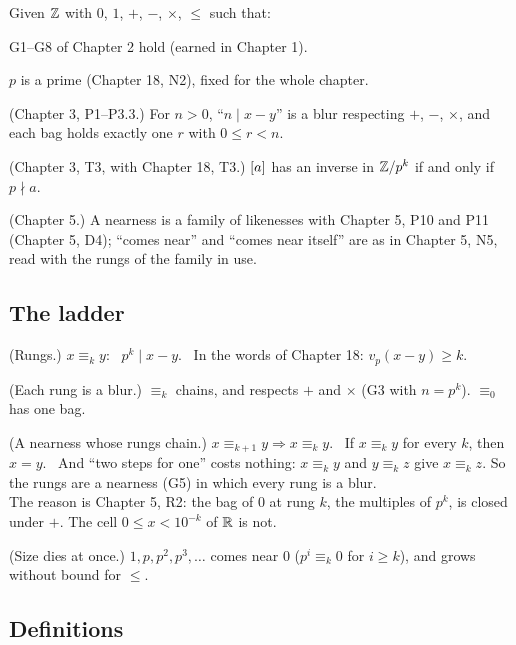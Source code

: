 Given $\mathbb{Z}$ with $0$, $1$, $+$, $-$, $\times$, $\le$ such that:
\begin{lines}
\item[\lab{G1}] G1--G8 of Chapter 2 hold (earned in Chapter 1).
\item[\lab{G2}] $p$ is a prime (Chapter 18, N2), fixed for the whole chapter.
\item[\lab{G3}] (Chapter 3, P1--P3.3.) For $n > 0$, ``$n \mid x - y$'' is a blur respecting $+$, $-$, $\times$, and each bag holds exactly one $r$ with $0 \le r < n$.
\item[\lab{G4}] (Chapter 3, T3, with Chapter 18, T3.) $[a]$ has an inverse in $\mathbb{Z}/p^k$ if and only if $p \nmid a$.
\item[\lab{G5}] (Chapter 5.) A nearness is a family of likenesses with Chapter 5, P10 and P11 (Chapter 5, D4); ``comes near'' and ``comes near itself'' are as in Chapter 5, N5, read with the rungs of the family in use.
\end{lines}

\subsection*{The ladder}

\begin{lines}
\item[\lab{D1}] (Rungs.) $x \equiv_k y$: \ $p^k \mid x - y$. \ In the words of Chapter 18: $v_p(x - y) \ge k$.
\item[\lab{P1}] (Each rung is a blur.) $\equiv_k$ chains, and respects $+$ and $\times$ (G3 with $n = p^k$). $\equiv_0$ has one bag.
\item[\lab{P2}] (A nearness whose rungs chain.) $x \equiv_{k+1} y \Rightarrow x \equiv_k y$. \ If $x \equiv_k y$ for every $k$, then $x = y$. \ And ``two steps for one'' costs nothing: $x \equiv_k y$ and $y \equiv_k z$ give $x \equiv_k z$. So the rungs are a nearness (G5) in which every rung is a blur. \\
The reason is Chapter 5, R2: the bag of $0$ at rung $k$, the multiples of $p^k$, is closed under $+$. The cell $0 \le x < 10^{-k}$ of $\mathbb{R}$ is not.
\item[\lab{P3}] (Size dies at once.) $1, p, p^2, p^3, \dots$ comes near $0$ ($p^i \equiv_k 0$ for $i \ge k$), and grows without bound for $\le$.
\end{lines}

\subsection*{Definitions}

